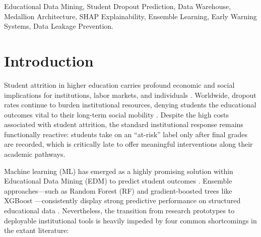 \documentclass[conference,a4paper]{IEEEtran}
\begin{document}
\begin{IEEEkeywords}
Educational Data Mining, Student Dropout Prediction, Data Warehouse, Medallion Architecture, SHAP Explainability, Ensemble Learning, Early Warning Systems, Data Leakage Prevention.
\end{IEEEkeywords}

\section{Introduction}\label{sec:intro}

Student attrition in higher education carries profound economic and social implications for institutions, labor markets, and individuals \cite{realinho2022}. Worldwide, dropout rates continue to burden institutional resources, denying students the educational outcomes vital to their long-term social mobility \cite{mduma2019}. Despite the high costs associated with student attrition, the standard institutional response remains functionally reactive: students take on an ``at-risk'' label only after final grades are recorded, which is critically late to offer meaningful interventions along their academic pathways.

Machine learning (ML) has emerged as a highly promising solution within Educational Data Mining (EDM) to predict student outcomes \cite{romero2020, baker2014edm}. Ensemble approaches---such as Random Forest (RF) \cite{breiman2001rf} and gradient-boosted trees like XGBoost \cite{chen2016xgboost}---consistently display strong predictive performance on structured educational data \cite{namoun2021, hellas2018}. Nevertheless, the transition from research prototypes to deployable institutional tools is heavily impeded by four common shortcomings in the extant literature:
\end{document}
